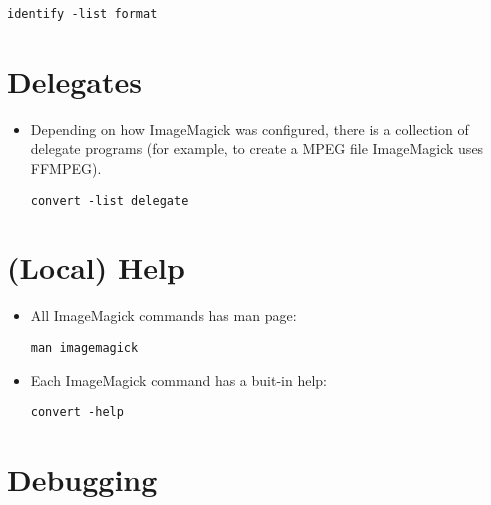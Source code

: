 \begin{lstlisting}
identify -list format
\end{lstlisting}


\section{Delegates}

\begin{itemize}
\item Depending on how ImageMagick was configured, there is a
  collection of delegate programs (for example, to create a MPEG
  file ImageMagick uses FFMPEG).
\begin{lstlisting}
convert -list delegate
\end{lstlisting}

\end{itemize}


\section{(Local) Help}

\begin{itemize}
\item All ImageMagick commands has man page:
\begin{lstlisting}
man imagemagick
\end{lstlisting}
\item Each ImageMagick command has a buit-in help:
\begin{lstlisting}
convert -help
\end{lstlisting}
\end{itemize}


\section{Debugging}

